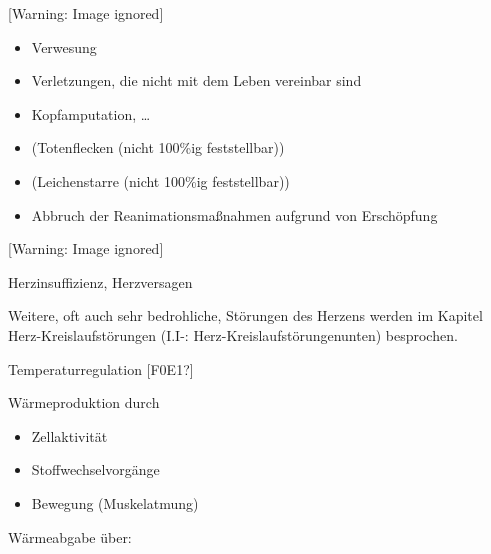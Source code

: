 \documentclass{article}
\begin{document}
\begin{center}
 [Warning: Image ignored] %

\end{center}
\begin{itemize}
\item %
%
Verwesung

\item Verletzungen, die nicht mit dem Leben  vereinbar sind

\end{itemize}
\begin{itemize}
\item Kopfamputation, {\dots}

\end{itemize}
\begin{itemize}
\item (Totenflecken (nicht 100\%ig feststellbar))

\item (Leichenstarre (nicht 100\%ig feststellbar))

\item Abbruch der Reanimationsma{\ss}nahmen aufgrund von Ersch\"opfung

\end{itemize}


\begin{center}
 [Warning: Image ignored] %

\end{center}
Herzinsuffizienz, Herzversagen

Weitere, oft auch sehr bedrohliche, St\"orungen des Herzens werden im
Kapitel  Herz-Kreislaufst\"orungen 
(I.I{}-\pageref{bkm:RefHeading42342802}:
{\quotedblbase}Herz-Kreislaufst\"orungenunten{\quotedblbase})
besprochen.

Temperaturregulation [F0E1?]

W\"armeproduktion durch

\begin{itemize}
\item Zellaktivit\"at

\item Stoffwechselvorg\"ange

\item Bewegung (Muskelatmung)

\end{itemize}
W\"armeabgabe \"uber:
\end{document}
